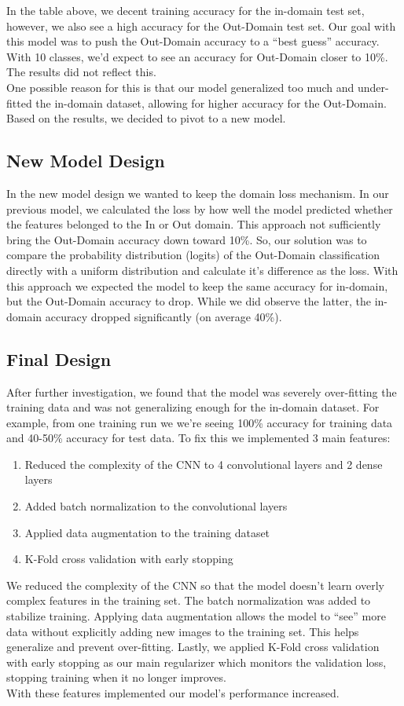 \documentclass[12pt]{article}
\begin{document}
  In the table above, we decent training accuracy for the in-domain test set, however, we also see a high accuracy for the Out-Domain test set. Our goal with this model was to push the Out-Domain accuracy to a ``best guess'' accuracy. With 10 classes, we'd expect to see an accuracy for Out-Domain closer to 10\%. The results did not reflect this. \\[1em]
  One possible reason for this is that our model generalized too much and under-fitted the in-domain dataset, allowing for higher accuracy for the Out-Domain. Based on the results, we decided to pivot to a new model. \\[1em]
  \subsection*{New Model Design}
  In the new model design we wanted to keep the domain loss mechanism. In our previous model, we calculated the loss by how well the model predicted whether the features belonged to the In or Out domain. This approach not sufficiently bring the Out-Domain accuracy down toward 10\%. So, our solution was to compare the probability distribution (logits) of the Out-Domain classification directly with a uniform distribution and calculate it's difference as the loss. With this approach we expected the model to keep the same accuracy for in-domain, but the Out-Domain accuracy to drop. While we did observe the latter, the in-domain accuracy dropped significantly (on average 40\%). 
  \subsection*{Final Design}
  After further investigation, we found that the model was severely over-fitting the training data and was not generalizing enough for the in-domain dataset. For example, from one training run we we're seeing 100\% accuracy for training data and 40-50\% accuracy for test data. To fix this we implemented 3 main features: \\
  \begin{enumerate}
    \item Reduced the complexity of the CNN to 4 convolutional layers and 2 dense layers
    \item Added batch normalization to the convolutional layers
    \item Applied data augmentation to the training dataset
    \item K-Fold cross validation with early stopping
  \end{enumerate}
  We reduced the complexity of the CNN so that the model doesn't learn overly complex features in the training set. The batch normalization was added to stabilize training. Applying data augmentation allows the model to ``see'' more data without explicitly adding new images to the training set. This helps generalize and prevent over-fitting. Lastly, we applied K-Fold cross validation with early stopping as our main regularizer which monitors the validation loss, stopping training when it no longer improves. \\
  With these features implemented our model's performance increased. 
\end{document}
